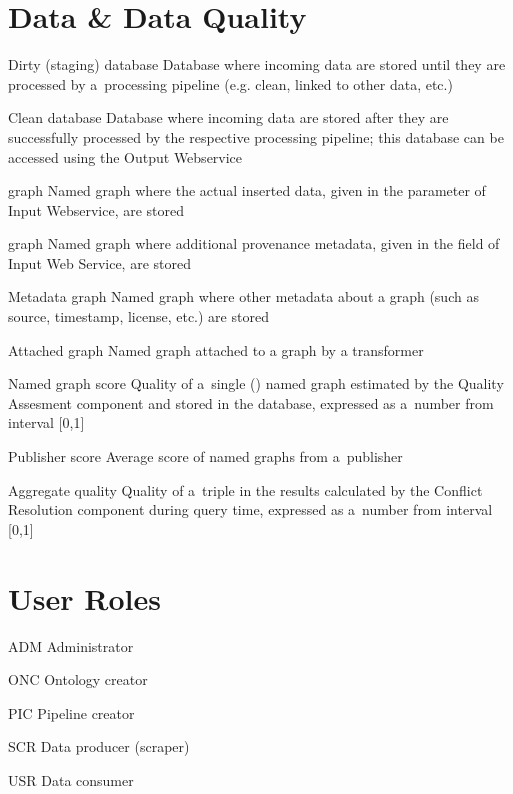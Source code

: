 \section*{Data \& Data Quality}
\begin{glossarylist}
	\item[Dirty (staging) database] Database where incoming data are stored until they are processed by a~processing pipeline (e.g. clean, linked to other data, etc.)
	\item[Clean database] Database where incoming data are stored after they are successfully processed by the respective processing pipeline; this database can be accessed using the Output Webservice
	\item[\code{Payload} graph] Named graph where the actual inserted data, given in the  parameter of Input Webservice, are stored
	\item[\code{Provenance} graph] Named graph where additional provenance metadata, given in the  field of Input Web Service, are stored
	\item[Metadata graph] Named graph where other metadata about a  graph (such as source, timestamp, license, etc.) are stored
	\item[Attached graph] Named graph attached to a  graph by a transformer
	\item[Named graph score] Quality of a~single () named graph estimated by the Quality Assesment component and stored in the database, expressed as a~number from interval [0,1]
	\item[Publisher score] Average score of named graphs from a~publisher
	\item[Aggregate quality] Quality of a~triple in the results calculated by the Conflict Resolution component during query time, expressed as a~number from interval [0,1]
\end{glossarylist}

\section*{User Roles}
\begin{glossarylist}
	\item[ADM] Administrator
	\item[ONC] Ontology creator
	\item[PIC] Pipeline creator
	\item[SCR] Data producer (scraper)
	\item[USR] Data consumer
\end{glossarylist}

